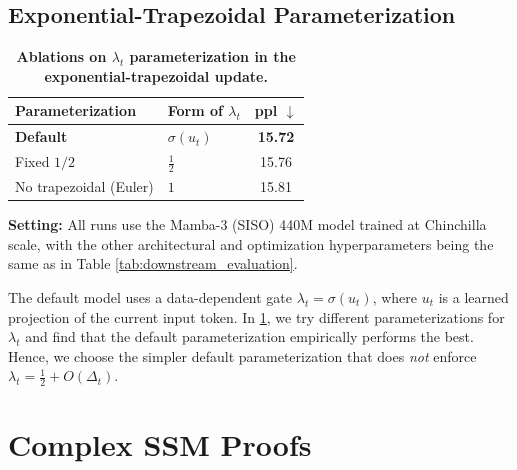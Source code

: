 \documentclass{article}
\theoremstyle{plain}
\theoremstyle{definition}
\theoremstyle{remark}
\begin{document}
\subsection{Exponential-Trapezoidal Parameterization}
\label{app:trap-param}
\begin{table}[h]
    \centering
    \small
    \caption{\textbf{Ablations on $\lambda_t$ parameterization in the exponential-trapezoidal update.}} 
    \begin{tabular}{l l c}
        \toprule
        \textbf{Parameterization} & \textbf{Form of $\lambda_t$} & \textbf{ppl $\downarrow$} \\
        \midrule
        \textbf{Default} & $\sigma(u_t)$ & \textbf{15.72} \\[5pt]
        Fixed $1/2$          & $\tfrac{1}{2}$ & 15.76 \\[5pt]
        No trapezoidal (Euler)      & $1$ & 15.81 \\
        \bottomrule
    \end{tabular}
    \label{tab:lambda_param_abl}
\end{table}

\textbf{Setting:} All runs use the Mamba-3 (SISO) 440M model trained at Chinchilla scale, with the other architectural and optimization hyperparameters being the same as in Table \ref{tab:downstream_evaluation}.

The default model uses a data-dependent gate 
$\lambda_t = \sigma(u_t)$, where $u_t$ is a learned projection of the current input token. 
In \cref{tab:lambda_param_abl}, we try different parameterizations for
$\lambda_t$ and find that the default parameterization empirically performs the best.
Hence, we choose the simpler default 
parameterization that does \emph{not} enforce \(\lambda_t = \tfrac{1}{2}+ O(\Delta_t)\).

\section{Complex SSM Proofs}
\end{document}
